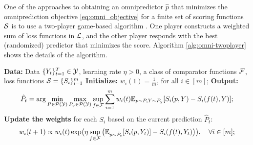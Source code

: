 


One of the approaches to obtaining an omnipredictor $\hat{p}$ that minimizes the omniprediction objective \eqref{eq:omni_objective} for a finite set of scoring functions $\mathcal{S}$ is to use a two-player game-based algorithm \cite{garg2024oracle, isaac2025omni, lu2025omni_nonlinear}. One player constructs a weighted sum of loss functions in $\mathcal{L}$, and the other player responds with the best (randomized) predictor that minimizes the score. Algorithm \ref{alg:omni-twoplayer} shows the details of the algorithm.

\begin{algorithm}
    \caption{Two-player game-based omniprediction} \label{alg:omni-twoplayer}
    \begin{algorithmic}[1]
    \State \textbf{Data:} Data $\{Y_t\}_{t=1}^T \in \mathcal{Y}$, learning rate $\eta > 0$, a class of comparator functions $\mathcal{F}$, loss functions $\mathcal{S} = \{S_i\}_{i=1}^m$
    \State \textbf{Initialize:} $w_i(1) = \frac{1}{m}$, for all $i \in [m]$;
        \State \textbf{Output:}
            \begin{align}\label{eq:omni_pre_minimax}
                \hat{P}_t = \arg\min_{P \in \mathcal{P}(\mathcal{Y})} \max_{P_y \in \mathcal{P}(\mathcal{Y})} \sup_{f \in \mathcal{F}}
                    \sum_{i=1}^m w_i(t) \mathbb{E}_{p \sim P, Y \sim P_y}[S_i(p, Y) - S_i(f(t), Y)];
            \end{align}
        \State \textbf{Update the weights} for each $S_i$ based on the current prediction $\hat{P}_t$:
            \begin{align*}
                w_i(t+1) \propto w_i(t) \exp\bigl(\eta \sup_{f \in \mathcal{F}}\big(\mathbb{E}_{p \sim \hat{P}_t}[S_i(p, Y_t)] 
                - S_i(f(t), Y_t)\big)\bigr), \quad \forall i \in [m];
            \end{align*}
    \EndFor
\end{algorithmic}
\end{algorithm}

